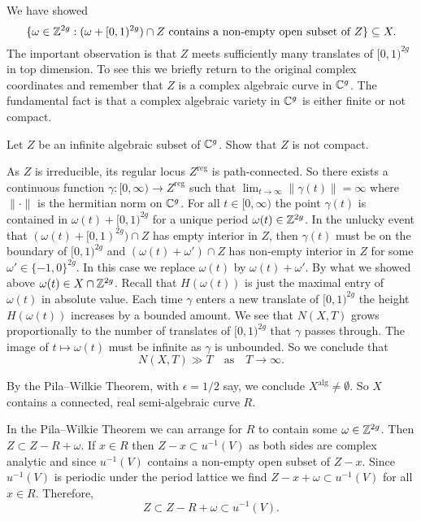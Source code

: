 We have showed
$$\{\omega\in{\mathbb{Z}}^{2g} :    (\omega+[0,1)^{2g})\cap
Z\text{ contains a non-empty open subset of $Z$}\} \subseteq X.$$ The important observation is that
$Z$ meets sufficiently many translates of $[0,1)^{2g}$ in top dimension. To see
this 
we briefly  return to the original complex
coordinates and remember that $Z$ is a complex
algebraic curve in ${\mathbb{C}}^g$. The fundamental fact is that a complex
algebraic variety in ${\mathbb{C}}^g$ is either finite or not compact.

\begin{exercise}
  Let $Z$ be an infinite algebraic subset of ${\mathbb{C}}^g$. Show that $Z$ is
  not compact. 
\end{exercise}

As $Z$ is irreducible, its regular locus $Z^{\mathrm{reg}}$ is
path-connected. 
So there exists  a continuous function $\gamma : [0,\infty)\rightarrow
Z^{\mathrm{reg}}$ such that $\lim_{t\rightarrow\infty} \|\gamma(t)\| = \infty$
where $\|\cdot\|$ is the hermitian norm on ${\mathbb{C}}^g$. 
For all $t\in [0,\infty)$ the point $\gamma(t)$ is contained in
$\omega(t)+[0,1)^{2g}$ for a unique period $\omega(t)\in{\mathbb{Z}}^{2g}$.
In the unlucky event
that $(\omega(t)+[0,1)^{2g}) \cap Z$ has empty interior
in $Z$, then $\gamma(t)$ must be on the boundary of $[0,1)^{2g}$ and
$(\omega(t)+\omega')\cap Z$ has non-empty interior in $Z$
for some $\omega' \in \{-1,0\}^{2g}$. In this case we replace
$\omega(t)$ by $\omega(t)+\omega'$. 
By
what we showed above $\omega(t)\in X\cap{\mathbb{Z}}^{2g}$.
Recall that $H(\omega(t))$ is
just the maximal entry of $\omega(t)$ in absolute value.
Each time
$\gamma$ enters a new translate of $[0,1)^{2g}$ the height
$H(\omega(t))$ increases by a bounded amount.
We see that $N(X,T)$ grows proportionally to the number of translates of
$[0,1)^{2g}$ that $\gamma$ passes through. The image of $t\mapsto \omega(t)$ must be infinite as $\gamma$ is unbounded. 
So we conclude that
\begin{equation*}
  N(X,T) \gg T\quad\text{as}\quad T\rightarrow\infty.
\end{equation*}

By the Pila--Wilkie Theorem, with $\epsilon=1/2$ say, we conclude
$X^{\mathrm{alg}}\not=\emptyset$. So
$X$ contains a connected, real semi-algebraic curve $R$. 

In the Pila--Wilkie Theorem we can arrange for $R$ to contain some
$\omega\in {\mathbb{Z}}^{2g}$. Then $Z\subset Z-R+\omega$. If $x\in R$ then
$Z-x\subset u^{-1}(V)$ as both sides are complex analytic and since
$u^{-1}(V)$ contains a non-empty open subset of $Z-x$. 
Since $u^{-1}(V)$ is periodic under the period lattice we find
$Z-x+\omega\subset u^{-1}(V)$ for all $x\in R$. Therefore,
\begin{equation*}
  Z\subset Z-R+\omega \subset u^{-1}(V).
\end{equation*}

